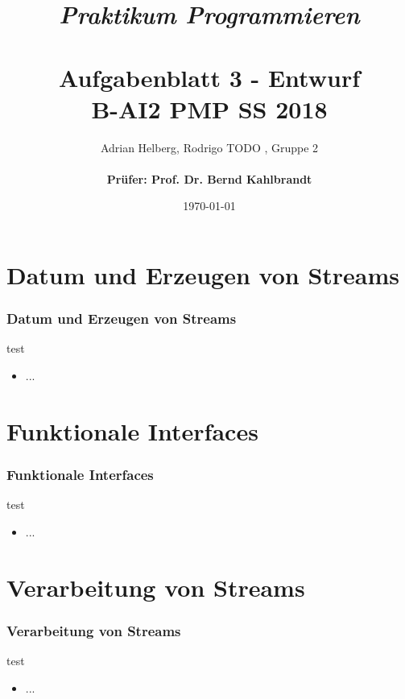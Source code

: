 \documentclass{beamer}
\title{
	\textit{Praktikum Programmieren} \\
	\textbf{\\Aufgabenblatt 3 - Entwurf} \\
	\scriptsize{B-AI2 PMP SS 2018}
}
\author{Adrian Helberg, Rodrigo TODO , Gruppe 2 \\\textbf{\\ Prüfer: Prof. Dr. Bernd Kahlbrandt}}
\date{\today}
\begin{document}

\maketitle

\frame{\tableofcontents}


\section{Datum und Erzeugen von Streams}
\begin{frame}
\frametitle{Datum und Erzeugen von Streams}

test

\begin{itemize}
\item ...
\end{itemize}

\end{frame}


\section{Funktionale Interfaces}
\begin{frame}
\frametitle{Funktionale Interfaces}

test

\begin{itemize}
\item ...
\end{itemize}

\end{frame}


\section{Verarbeitung von Streams}
\begin{frame}
\frametitle{Verarbeitung von Streams}

test

\begin{itemize}
\item ...
\end{itemize}

\end{frame}
\end{document}

